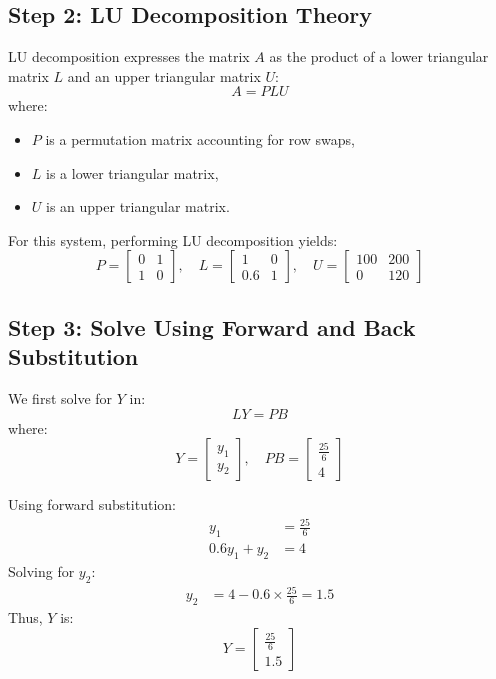 \documentclass[article]{IEEEtran}
\numberwithin{figure}{enumi}
\begin{document}
\subsection*{Step 2: LU Decomposition Theory}
LU decomposition expresses the matrix \( A \) as the product of a lower triangular matrix \( L \) and an upper triangular matrix \( U \):
\begin{equation*}
    A = P L U
\end{equation*}
where:
\begin{itemize}
    \item \( P \) is a permutation matrix accounting for row swaps,
    \item \( L \) is a lower triangular matrix,
    \item \( U \) is an upper triangular matrix.
\end{itemize}

For this system, performing LU decomposition yields:
\begin{equation*}
    P = \begin{bmatrix} 0 & 1 \\ 1 & 0 \end{bmatrix},
    \quad L = \begin{bmatrix} 1 & 0 \\ 0.6 & 1 \end{bmatrix},
    \quad U = \begin{bmatrix} 100 & 200 \\ 0 & 120 \end{bmatrix}
\end{equation*}

\subsection*{Step 3: Solve Using Forward and Back Substitution}
We first solve for \( Y \) in:
\begin{equation*}
    L Y = P B
\end{equation*}
where:
\begin{equation*}
    Y = \begin{bmatrix} y_1 \\ y_2 \end{bmatrix},
    \quad P B = \begin{bmatrix} \frac{25}{6} \\ 4 \end{bmatrix}
\end{equation*}

Using forward substitution:
\begin{align*}
    y_1 &= \frac{25}{6} \\
    0.6 y_1 + y_2 &= 4
\end{align*}
Solving for \( y_2 \):
\begin{align*}
    y_2 &= 4 - 0.6 \times \frac{25}{6} = 1.5
\end{align*}
Thus, \( Y \) is:
\begin{equation*}
    Y = \begin{bmatrix} \frac{25}{6} \\ 1.5 \end{bmatrix}
\end{equation*}
\end{document}

